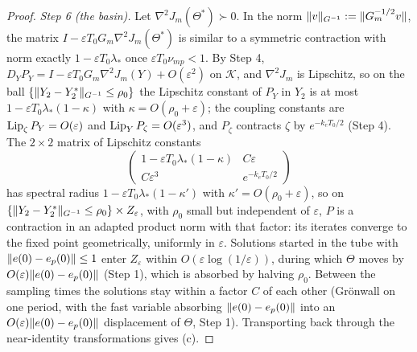 \begin{proof}
\smallskip
\emph{Step 6 (the basin).} Let $\nabla^2J_m(\Theta^*)\succ0$. In the norm $\lVert v\rVert_{G^{-1}} := \lVert G_m^{-1/2}v\rVert$,
the matrix $I - \varepsilon T_0G_m\nabla^2J_m(\Theta^*)$ is similar to a symmetric contraction with norm exactly
$1 - \varepsilon T_0\lambda_*$ once $\varepsilon T_0\nu_{mp} < 1$. By Step 4,
$D_YP_Y = I - \varepsilon T_0G_m\nabla^2J_m(Y) + O(\varepsilon^2)$ on $\mathcal K$, and $\nabla^2J_m$ is Lipschitz, so
on the ball $\{\lVert Y_2 - Y_2^*\rVert_{G^{-1}} \le \rho_0\}$ the Lipschitz constant of $P_Y$ in $Y_2$ is at most
$1 - \varepsilon T_0\lambda_*(1 - \kappa)$ with $\kappa = O(\rho_0 + \varepsilon)$; the coupling constants are
$\operatorname{Lip}_\zeta P_Y = O(\varepsilon)$ and $\operatorname{Lip}_YP_\zeta = O(\varepsilon^3)$, and $P_\zeta$ contracts $\zeta$ by
$e^{-k_eT_0/2}$ (Step 4). The $2\times2$ matrix of Lipschitz constants
\[
  \begin{pmatrix} 1 - \varepsilon T_0\lambda_*(1 - \kappa) & C\varepsilon\\ C\varepsilon^3 & e^{-k_eT_0/2}\end{pmatrix}
\]
has spectral radius $1 - \varepsilon T_0\lambda_*(1 - \kappa')$ with $\kappa' = O(\rho_0 + \varepsilon)$, so on
$\{\lVert Y_2 - Y_2^*\rVert_{G^{-1}} \le \rho_0\}\times Z_\varepsilon$, with $\rho_0$ small but independent of
$\varepsilon$, $P$ is a contraction in an adapted product norm with that factor: its iterates converge to the fixed
point geometrically, uniformly in $\varepsilon$. Solutions started in the tube with $\lVert e(0) - e_p(0)\rVert \le 1$ enter
$Z_\varepsilon$ within $O(\varepsilon\log(1/\varepsilon))$, during which $\Theta$ moves by
$O(\varepsilon)\lVert e(0) - e_p(0)\rVert$ (Step 1), which is absorbed by halving $\rho_0$. Between the sampling times the
solutions stay within a factor $C$ of each other (Grönwall on one period, with the fast variable absorbing
$\lVert e(0) - e_p(0)\rVert$ into an $O(\varepsilon)\lVert e(0) - e_p(0)\rVert$ displacement of $\Theta$, Step 1). Transporting
back through the near-identity transformations gives \textup{(c)}.
\end{proof}

